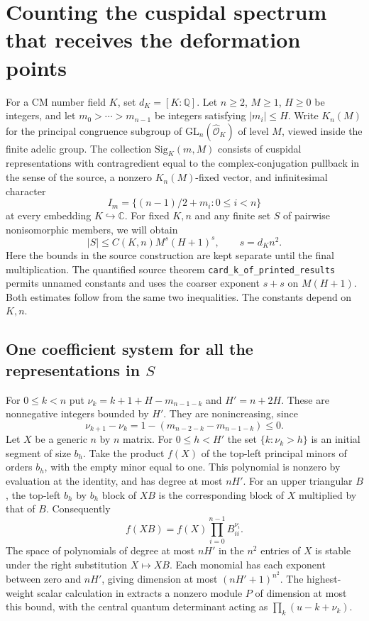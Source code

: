 \section{Counting the cuspidal spectrum that receives the deformation points}
\label{sec:spectrum-deformation}

For a CM number field $K$, set $d_K=[K:\mathbb Q]$. Let $n\ge2$,
$M\ge1$, $H\ge0$ be integers, and let $m_0>\cdots>m_{n-1}$ be
integers satisfying $|m_i|\le H$. Write $K_n(M)$ for the principal
congruence subgroup of $\mathrm{GL}_n(\widehat{\mathcal O}_K)$ of level
$M$, viewed inside the finite adelic group. The collection
$\mathrm{Sig}_K(m,M)$ consists of cuspidal representations with
contragredient equal to the complex-conjugation pullback in the sense of
the source, a nonzero $K_n(M)$-fixed vector, and infinitesimal character
\[
                    I_m=\{(n-1)/2+m_i:0\le i<n\}
\]
at every embedding $K\hookrightarrow\mathbb C$. For fixed $K,n$
and any finite set $S$ of pairwise nonisomorphic members, we will obtain
\begin{equation}
 |S|\le C(K,n) M^{s}(H+1)^s,\qquad s=d_K n^2 .
 \label{eq:spectrum-count}
\end{equation}
Here the bounds in the source construction are kept separate until
the final multiplication. The quantified source theorem
\texttt{card\_k\_of\_printed\_results} permits unnamed constants and
uses the coarser exponent $s+s$ on $M(H+1)$. Both estimates follow from
the same two inequalities. The constants depend on $K,n$.

\subsection{One coefficient system for all the representations in $S$}

For $0\le k<n$ put $\nu_k=k+1+H-m_{n-1-k}$ and $H'=n+2H$.
These are nonnegative integers bounded by $H'$. They are
nonincreasing, since
\[
       \nu_{k+1}-\nu_k=1-(m_{n-2-k}-m_{n-1-k})\le0 .
\]
Let $X$ be a generic $n$ by $n$ matrix. For $0\le h<H'$ the set
$\{k:\nu_k>h\}$ is an initial segment of size $b_h$.
Take the product $f(X)$ of the top-left principal minors of orders
$b_h$, with the empty minor equal to one. This polynomial is nonzero
by evaluation at the identity, and has degree at most $nH'$.
For an upper triangular $B$, the top-left $b_h$ by $b_h$ block of
$XB$ is the corresponding block of $X$ multiplied by that of $B$.
Consequently
\[
             f(XB)=f(X)\prod_{i=0}^{n-1} B_{ii}^{\nu_i}.
\]
The space of polynomials of degree at most $nH'$ in the $n^2$
entries of $X$ is stable under the right substitution $X\mapsto XB$.
Each monomial has each exponent between zero and $nH'$, giving
dimension at most $(nH'+1)^{n^2}$. The highest-weight scalar
calculation in  extracts a nonzero module $P$
of dimension at most this bound, with the central quantum determinant
acting as $\prod_k(u-k+\nu_k)$.

